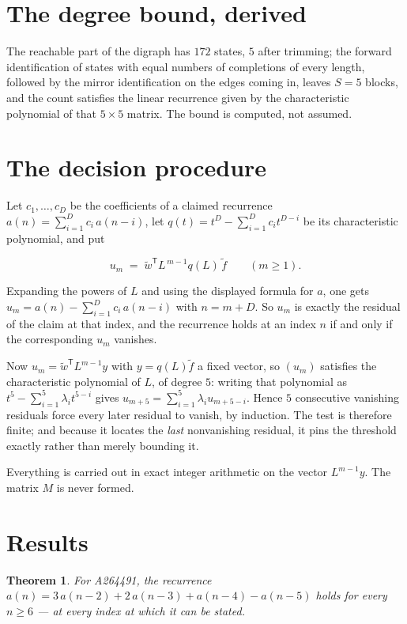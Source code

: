 \documentclass[11pt]{article}
\newtheorem{theorem}{Theorem}
\theoremstyle{definition}
\begin{document}
\section{The degree bound, derived}

The reachable part of the digraph has $172$ states, $5$ after trimming; the forward identification of states with equal numbers of completions of every length, followed by the mirror identification on the edges coming in, leaves $S = 5$ blocks, and the count satisfies the linear recurrence given by the characteristic polynomial of that $5\times5$ matrix. The bound is computed, not assumed.

\section{The decision procedure}

Let $c_1,\dots,c_D$ be the coefficients of a claimed recurrence $a(n) = \sum_{i=1}^{D} c_i\,a(n-i)$, let $q(t) = t^{D} - \sum_{i=1}^{D} c_i t^{D-i}$ be its characteristic polynomial, and put

\[u_m \;=\; \tilde w^{\mathsf T} L^{\,m-1} q(L)\,\tilde f \qquad (m \ge 1).\]

Expanding the powers of $L$ and using the displayed formula for $a$, one gets $u_m = a(n) - \sum_{i=1}^{D} c_i\,a(n-i)$ with $n = m + D$. So $u_m$ is exactly the residual of the claim at that index, and the recurrence holds at an index $n$ if and only if the corresponding $u_m$ vanishes.

Now $u_m = \tilde w^{\mathsf T} L^{m-1} y$ with $y = q(L)\tilde f$ a fixed vector, so $(u_m)$ satisfies the characteristic polynomial of $L$, of degree $5$: writing that polynomial as $t^{5} - \sum_{i=1}^{5} \lambda_i t^{5-i}$ gives $u_{m+5} = \sum_{i=1}^{5} \lambda_i u_{m+5-i}$. Hence $5$ consecutive vanishing residuals force every later residual to vanish, by induction. The test is therefore finite; and because it locates the {\itshape last} nonvanishing residual, it pins the threshold exactly rather than merely bounding it.

Everything is carried out in exact integer arithmetic on the vector $L^{m-1}y$. The matrix $M$ is never formed.

\section{Results}

\begin{theorem} For A264491, the recurrence $a(n) = 3\,a(n-2) + 2\,a(n-3) + a(n-4) - a(n-5)$ holds for every $n \ge 6$ --- at every index at which it can be stated.\end{theorem}
\end{document}
